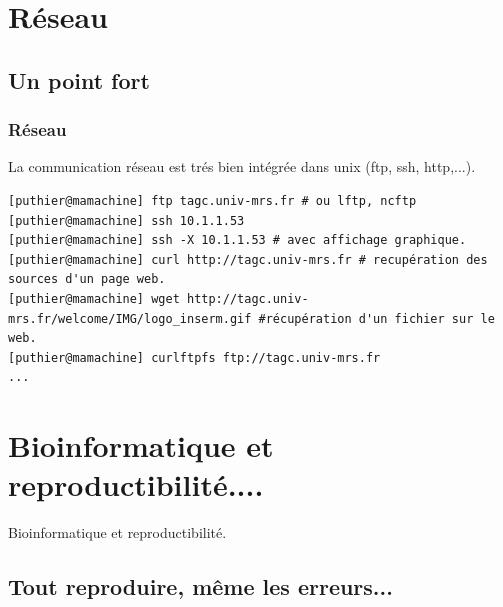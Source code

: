 \documentclass[10pt, xcolor=dvipsnames]{beamer}
\begin{document}
\section{Réseau}
\subsection{Un point fort}
\begin{frame}[fragile]
 \frametitle{Réseau}
La communication réseau est trés bien intégrée dans unix (ftp, ssh, http,...).

\begin{tiny}
\begin{verbatim}
[puthier@mamachine] ftp tagc.univ-mrs.fr # ou lftp, ncftp
[puthier@mamachine] ssh 10.1.1.53 
[puthier@mamachine] ssh -X 10.1.1.53 # avec affichage graphique.
[puthier@mamachine] curl http://tagc.univ-mrs.fr # recupération des sources d'un page web.
[puthier@mamachine] wget http://tagc.univ-mrs.fr/welcome/IMG/logo_inserm.gif #récupération d'un fichier sur le web. 
[puthier@mamachine] curlftpfs ftp://tagc.univ-mrs.fr
...
\end{verbatim}
\end{tiny}

\end{frame}


\section{Bioinformatique et reproductibilité....}

\frame
{
\begin{block}{}
\begin{center}
\begin{huge}
Bioinformatique et reproductibilité.
\end{huge}
\end{center}
\end{block}

}



\subsection{Tout reproduire, même les erreurs...}
\end{document}
